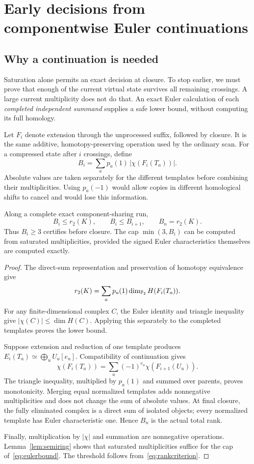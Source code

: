 \section{Early decisions from componentwise Euler continuations}
\label{sec:euler}

\subsection{Why a continuation is needed}
Saturation alone permits an exact decision at closure. To stop earlier, we
must prove that enough of the current virtual state survives all remaining
crossings. A large current multiplicity does not do that. An exact Euler
calculation of each \emph{completed independent summand} supplies a safe
lower bound, without computing its full homology.

Let $F_i$ denote extension through the unprocessed suffix, followed by
closure. It is the same additive, homotopy-preserving operation used by the
ordinary scan. For a compressed state after $i$ crossings, define
\begin{equation}\label{eq:eulerbound}
 B_i=\sum_a p_a(1)\,|\chi(F_i(T_a))|.
\end{equation}
Absolute values are taken separately for the different templates before
combining their multiplicities. Using $p_a(-1)$ would allow copies in
different homological shifts to cancel and would lose this information.

\begin{theorem}\label{thm:euler}
Along a complete exact component-sharing run,
\[
 B_i\le r_2(K),\qquad B_i\le B_{i+1},\qquad B_n=r_2(K).
\]
Thus $B_i\ge3$ certifies \KNOTTED before closure. The cap
$\min(3,B_i)$ can be computed from saturated multiplicities, provided the
signed Euler characteristics themselves are computed exactly.
\end{theorem}
\begin{proof}
The direct-sum representation and preservation of homotopy equivalence give
\[
 r_2(K)=\sum_a p_a(1)\dim_{\mathbb F_2}H(F_i(T_a)).
\]
For any finite-dimensional complex $C$, the Euler identity and triangle
inequality give $|\chi(C)|\le\dim H(C)$. Applying this separately to the
completed templates proves the lower bound.

Suppose extension and reduction of one template produces
$E_i(T_a)\simeq\bigoplus_u U_u[e_u]$. Compatibility of continuation gives
\[
 \chi(F_i(T_a))=\sum_u(-1)^{e_u}\chi(F_{i+1}(U_u)).
\]
The triangle inequality, multiplied by $p_a(1)$ and summed over parents,
proves monotonicity. Merging equal normalized templates adds nonnegative
multiplicities and does not change the sum of absolute values. At final
closure, the fully eliminated complex is a direct sum of isolated objects;
every normalized template has Euler characteristic one. Hence $B_n$ is the
actual total rank.

Finally, multiplication by $|\chi|$ and summation are nonnegative
operations. Lemma~\ref{lem:semiring} shows that saturated multiplicities
suffice for the cap of~\eqref{eq:eulerbound}. The threshold follows
from~\eqref{eq:rankcriterion}.
\end{proof}

